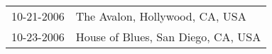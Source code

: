 \begin{supertabular}{ll}
 10-21-2006 &      The Avalon, Hollywood, CA, USA \\
 10-23-2006 &  House of Blues, San Diego, CA, USA \\
\end{supertabular}
